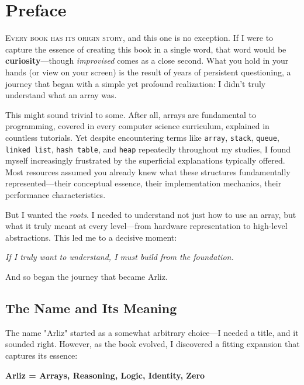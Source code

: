 \chapter{Preface}

\lettrine{E}{very book has its origin story}, and this one is no exception. If I were to capture the essence of creating this book in a single word, that word would be \textbf{curiosity}—though \emph{improvised} comes as a close second. What you hold in your hands (or view on your screen) is the result of years of persistent questioning, a journey that began with a simple yet profound realization: I didn't truly understand what an array was.

This might sound trivial to some. After all, arrays are fundamental to programming, covered in every computer science curriculum, explained in countless tutorials. Yet despite encountering terms like \texttt{array}, \texttt{stack}, \texttt{queue}, \texttt{linked list}, \texttt{hash table}, and \texttt{heap} repeatedly throughout my studies, I found myself increasingly frustrated by the superficial explanations typically offered. Most resources assumed you already knew what these structures fundamentally represented—their conceptual essence, their implementation mechanics, their performance characteristics.

But I wanted the \emph{roots}. I needed to understand not just how to use an array, but what it truly meant at every level—from hardware representation to high-level abstractions. This led me to a decisive moment:

\begin{center}
	\emph{If I truly want to understand, I must build from the foundation.}
\end{center}

And so began the journey that became Arliz.

\section*{The Name and Its Meaning}

The name "Arliz" started as a somewhat arbitrary choice—I needed a title, and it sounded right. However, as the book evolved, I discovered a fitting expansion that captures its essence:

\begin{center}
	\textbf{Arliz = Arrays, Reasoning, Logic, Identity, Zero}
\end{center}

